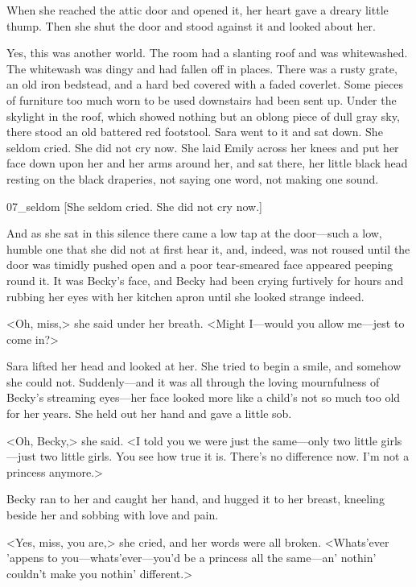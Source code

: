 When she reached the attic door and opened it, her heart gave a dreary little thump. Then she shut the door and stood against it and looked about her.

Yes, this was another world. The room had a slanting roof and was whitewashed. The whitewash was dingy and had fallen off in places. There was a rusty grate, an old iron bedstead, and a hard bed covered with a faded coverlet. Some pieces of furniture too much worn to be used downstairs had been sent up. Under the skylight in the roof, which showed nothing but an oblong piece of dull gray sky, there stood an old battered red footstool. Sara went to it and sat down. She seldom cried. She did not cry now. She laid Emily across her knees and put her face down upon her and her arms around her, and sat there, her little black head resting on the black draperies, not saying one word, not making one sound.

\begin{colorbigpic}
	[\basicscale]
	{07_seldom}
	[She seldom cried. She did not cry now.]
\end{colorbigpic}

And as she sat in this silence there came a low tap at the door—such a low, humble one that she did not at first hear it, and, indeed, was not roused until the door was timidly pushed open and a poor tear-smeared face appeared peeping round it. It was Becky's face, and Becky had been crying furtively for hours and rubbing her eyes with her kitchen apron until she looked strange indeed.

<Oh, miss,> she said under her breath. <Might I—would you allow me—jest to come in?>

Sara lifted her head and looked at her. She tried to begin a smile, and somehow she could not. Suddenly—and it was all through the loving mournfulness of Becky's streaming eyes—her face looked more like a child's not so much too old for her years. She held out her hand and gave a little sob.

<Oh, Becky,> she said. <I told you we were just the same—only two little girls—just two little girls. You see how true it is. There's no difference now. I'm not a princess anymore.>

Becky ran to her and caught her hand, and hugged it to her breast, kneeling beside her and sobbing with love and pain.

<Yes, miss, you are,> she cried, and her words were all broken. <Whats'ever 'appens to you—whats'ever—you'd be a princess all the same—an' nothin' couldn't make you nothin' different.>